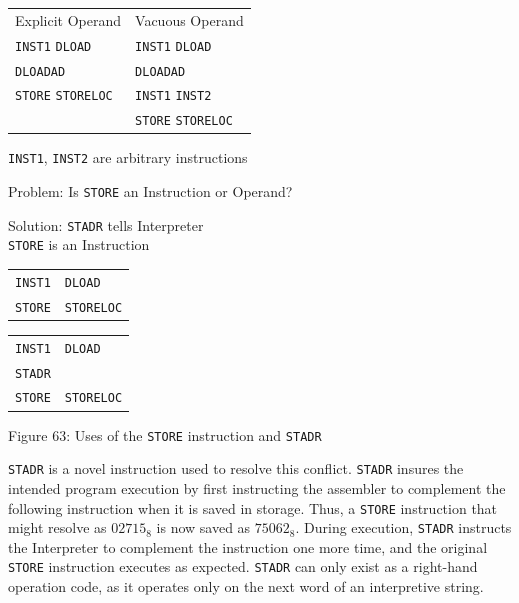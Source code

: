 \documentclass[refcap, oxford]{ahsan}
\begin{document}
\begin{center}
\begin{tabular}{ll}
Explicit Operand & Vacuous Operand \\
\texttt{INST1} \texttt{DLOAD} & \texttt{INST1} \texttt{DLOAD} \\
\texttt{DLOADAD} & \texttt{DLOADAD} \\
\texttt{STORE} \texttt{STORELOC} & \texttt{INST1} \texttt{INST2} \\
 & \texttt{STORE} \texttt{STORELOC} \\
\end{tabular}
\end{center}

\texttt{INST1}, \texttt{INST2} are arbitrary instructions

Problem: Is \texttt{STORE} an Instruction or Operand?

Solution: \texttt{STADR} tells Interpreter\\
\texttt{STORE} is an Instruction

\begin{center}
\begin{tabular}{ll}
\texttt{INST1} & \texttt{DLOAD} \\
\texttt{STORE} & \texttt{STORELOC} \\
\end{tabular}
\end{center}

\begin{center}
\begin{tabular}{ll}
\texttt{INST1} & \texttt{DLOAD} \\
\texttt{STADR} &  \\
\texttt{STORE} & \texttt{STORELOC} \\
\end{tabular}
\end{center}

Figure 63: Uses of the \texttt{STORE} instruction and \texttt{STADR}

\texttt{STADR} is a novel instruction used to resolve this conflict. \texttt{STADR} insures the intended program execution by first instructing the assembler to complement the following instruction when it is saved in storage. Thus, a \texttt{STORE} instruction that might resolve as $02715_{8}$ is now saved as $75062_{8}$. During execution, \texttt{STADR} instructs the Interpreter to complement the instruction one more time, and the original \texttt{STORE} instruction executes as expected. \texttt{STADR} can only exist as a right-hand operation code, as it operates only on the next word of an interpretive string.
\end{document}
